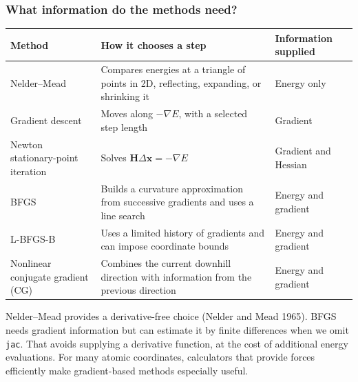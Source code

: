 \documentclass[
  11pt,
  letterpaper,
  DIV=11,
  numbers=noendperiod]{scrartcl}
\newcounter{none} %
\begin{document}
\subsubsection{What information do the methods
need?}\label{what-information-do-the-methods-need}

{\def\LTcaptype{none} %
\begin{longtable}[]{@{}
  >{\raggedright\arraybackslash}p{}
  >{\raggedright\arraybackslash}p{}
  >{\raggedright\arraybackslash}p{}@{}}
\toprule\noalign{}
\begin{minipage}[b]{\linewidth}\raggedright
Method
\end{minipage} & \begin{minipage}[b]{\linewidth}\raggedright
How it chooses a step
\end{minipage} & \begin{minipage}[b]{\linewidth}\raggedright
Information supplied
\end{minipage} \\
\midrule\noalign{}
\endhead
\bottomrule\noalign{}
\endlastfoot
Nelder--Mead & Compares energies at a triangle of points in 2D,
reflecting, expanding, or shrinking it & Energy only \\
Gradient descent & Moves along \(-\nabla E\), with a selected step
length & Gradient \\
Newton stationary-point iteration & Solves
\(\mathbf H\Delta\mathbf x=-\nabla E\) & Gradient and Hessian \\
BFGS & Builds a curvature approximation from successive gradients and
uses a line search & Energy and gradient \\
L-BFGS-B & Uses a limited history of gradients and can impose coordinate
bounds & Energy and gradient \\
Nonlinear conjugate gradient (CG) & Combines the current downhill
direction with information from the previous direction & Energy and
gradient \\
\end{longtable}
}

Nelder--Mead provides a derivative-free choice (Nelder and Mead 1965).
BFGS needs gradient information but can estimate it by finite
differences when we omit \texttt{jac}. That avoids supplying a
derivative function, at the cost of additional energy evaluations. For
many atomic coordinates, calculators that provide forces efficiently
make gradient-based methods especially useful.
\end{document}
